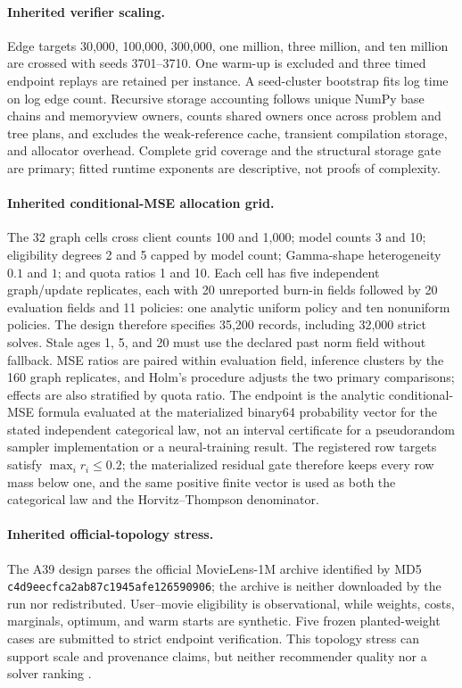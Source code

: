\paragraph{Inherited verifier scaling.}
Edge targets 30,000, 100,000, 300,000, one million, three million, and ten
million are crossed with seeds 3701--3710.  One warm-up is excluded and three
timed endpoint replays are retained per instance.  A seed-cluster bootstrap fits
log time on log edge count.  Recursive storage accounting follows unique NumPy
base chains and memoryview owners, counts shared owners once across problem and
tree plans, and excludes the weak-reference cache, transient compilation
storage, and allocator overhead.  Complete grid coverage and the structural
storage gate are primary; fitted runtime exponents are descriptive, not proofs
of complexity.

\paragraph{Inherited conditional-MSE allocation grid.}
The 32 graph cells cross client counts 100 and 1,000; model counts 3 and 10;
eligibility degrees 2 and 5 capped by model count; Gamma-shape heterogeneity
$0.1$ and $1$; and quota ratios 1 and 10.  Each cell has five independent
graph/update replicates, each with 20 unreported burn-in fields followed by 20
evaluation fields and 11 policies: one analytic uniform policy and ten
nonuniform policies.  The design therefore specifies 35,200 records, including
32,000 strict solves.  Stale ages 1, 5, and 20 must use the declared past norm
field without fallback.  MSE ratios are paired within evaluation field,
inference clusters by the 160 graph replicates, and Holm's procedure adjusts the
two primary comparisons; effects are also stratified by quota ratio.  The
endpoint is the analytic conditional-MSE formula evaluated at the materialized
binary64 probability vector for the stated independent categorical law, not an
interval certificate for a pseudorandom sampler implementation or a
neural-training result.  The registered row targets satisfy
$\max_i r_i\le0.2$; the materialized residual gate therefore keeps every row
mass below one, and the same positive finite vector is used as both the
categorical law and the Horvitz--Thompson denominator.

\paragraph{Inherited official-topology stress.}
The A39 design parses the official MovieLens-1M archive identified
by MD5 \nolinkurl{c4d9eecfca2ab87c1945afe126590906}; the archive is neither
downloaded by the run nor redistributed.  User--movie eligibility is
observational, while weights, costs, marginals, optimum, and warm starts are
synthetic.  Five frozen planted-weight cases are submitted to strict endpoint
verification.  This topology stress can support scale and provenance claims,
but neither recommender quality nor a solver ranking
\citep{harper2015movielens}.

